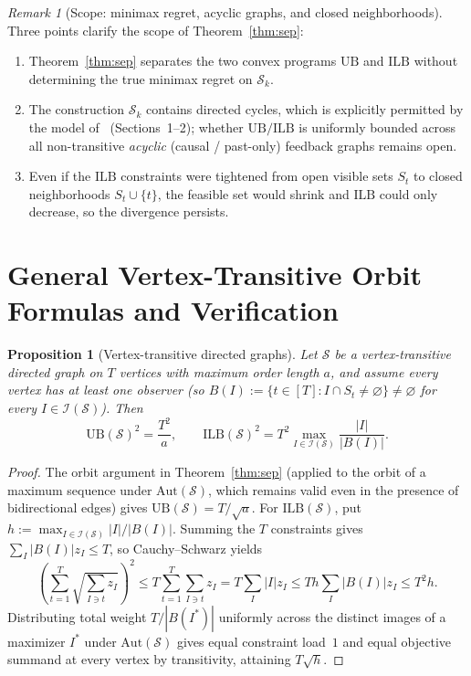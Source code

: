 \documentclass[11pt]{article}
\theoremstyle{plain}
\newtheorem{proposition}[theorem]{Proposition}
\theoremstyle{definition}
\theoremstyle{remark}
\newtheorem{remark}{Remark}
\newcommand{\UB}{\mathrm{UB}}
\newcommand{\ILB}{\mathrm{ILB}}
\begin{document}
\begin{remark}[Scope: minimax regret, acyclic graphs, and closed neighborhoods]
Three points clarify the scope of Theorem~\ref{thm:sep}:
\begin{enumerate}[label=\textup{(\roman*)}]
\item Theorem~\ref{thm:sep} separates the two convex programs $\UB$ and $\ILB$ without determining the true minimax regret on $\mathcal{S}_k$.
\item The construction $\mathcal{S}_k$ contains directed cycles, which is explicitly permitted by the model of~\cite{GatmirySchneider2024} (Sections~1--2); whether $\UB/\ILB$ is uniformly bounded across all non-transitive \emph{acyclic} (causal / past-only) feedback graphs remains open.
\item Even if the $\ILB$ constraints were tightened from open visible sets $S_t$ to closed neighborhoods $S_t \cup \{t\}$, the feasible set would shrink and $\ILB$ could only decrease, so the divergence persists.
\end{enumerate}
\end{remark}

\section{General Vertex-Transitive Orbit Formulas and Verification}

\begin{proposition}[Vertex-transitive directed graphs]\label{prop:vt}
Let $\mathcal{S}$ be a vertex-transitive directed graph on $T$ vertices with maximum order length $a$, and assume every vertex has at least one observer (so $B(I) := \{t \in [T] : I \cap S_t \neq \varnothing\} \neq \varnothing$ for every $I \in \mathcal{I}(\mathcal{S})$). Then
\[
\UB(\mathcal{S})^2 = \frac{T^2}{a}, \qquad
\ILB(\mathcal{S})^2 = T^2 \max_{I \in \mathcal{I}(\mathcal{S})} \frac{|I|}{|B(I)|}.
\]
\end{proposition}

\begin{proof}
The orbit argument in Theorem~\ref{thm:sep} (applied to the orbit of a maximum sequence under $\mathrm{Aut}(\mathcal{S})$, which remains valid even in the presence of bidirectional edges) gives $\UB(\mathcal{S}) = T/\sqrt{a}$.
For $\ILB(\mathcal{S})$, put $h := \max_{I \in \mathcal{I}(\mathcal{S})} |I|/|B(I)|$. Summing the $T$ constraints gives $\sum_I |B(I)| z_I \le T$, so Cauchy--Schwarz yields
\[
\left(\sum_{t=1}^T \sqrt{\sum_{I \ni t} z_I}\right)^2
\le T \sum_{t=1}^T \sum_{I \ni t} z_I
= T \sum_I |I| z_I
\le T h \sum_I |B(I)| z_I
\le T^2 h.
\]
Distributing total weight $T / |B(I^*)|$ uniformly across the distinct images of a maximizer $I^*$ under $\mathrm{Aut}(\mathcal{S})$ gives equal constraint load~$1$ and equal objective summand at every vertex by transitivity, attaining $T\sqrt{h}$.
\end{proof}
\end{document}
